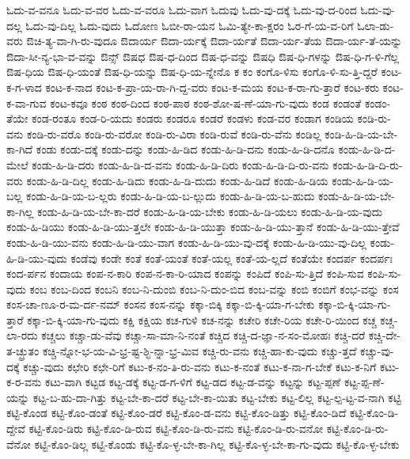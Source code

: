 {ಓದು-ವ-ವನೂ
ಓದು-ವ-ವರ
ಓದು-ವ-ವರೂ
ಓದು-ವಾಗ
ಓದುವು
ಓದು-ವು-ದಕ್ಕೆ
ಓದು-ವು-ದ-ರಿಂದ
ಓದು-ವು-ದಲ್ಲ
ಓದು-ವು-ದಿಲ್ಲ
ಓದು-ವುದು
ಓದೋಣ
ಓಬೀ-ರಾ-ಯನ
ಓಮಿ-ತ್ಯೇ-ಕಾ-ಕ್ಷರಂ
ಓರ-ಗೆ-ಯ-ವ-ರಿಗೆ
ಓಲಾ-ಡು-ವರು
ಔಚಿ-ತ್ಯ-ವಾ-ಗಿ-ರು-ವುದೂ
ಔದಾರ್ಯ
ಔದಾ-ರ್ಯಕ್ಕೆ
ಔದಾ-ರ್ಯತೆ
ಔದಾ-ರ್ಯ-ತೆಯ
ಔದಾ-ರ್ಯ-ತೆ-ಯನ್ನು
ಔದಾ-ಸೀ-ನ್ಯ-ಭಾ-ವ-ವನ್ನು
ಔನ್ಸ್
ಔಷಧ
ಔಷ-ಧ-ದಿಂದ
ಔಷ-ಧ-ವನ್ನು
ಔಷಧಿ
ಔಷ-ಧಿ-ಗಳನ್ನು
ಔಷ-ಧಿ-ಗ-ಳಿ-ಗೆಲ್ಲ
ಔಷ-ಧಿಯ
ಔಷ-ಧಿ-ಯಂತೆ
ಔಷ-ಧಿ-ಯನ್ನು
ಔಷ-ಧಿ-ಯ-ನ್ನೇನೊ
ಕ
ಕಂ
ಕಂಗೊ-ಳಿಸು
ಕಂಗೊ-ಳಿ-ಸು-ತ್ತಿ-ದ್ದರೆ
ಕಂಟ-ಕ-ಗ-ಳಾದ
ಕಂಟ-ಕ-ನಾದ
ಕಂಟ-ಕ-ಪ್ರಾ-ಯ-ರಾ-ಗಿ-ದ್ದ-ವರು
ಕಂಟ-ಕ-ಮಯ
ಕಂಟ-ಕ-ರಾ-ಗು-ತ್ತಾರೆ
ಕಂಟ-ಕರು
ಕಂಟ-ಕ-ವಾ-ಗುವ
ಕಂಟ-ಕವೂ
ಕಂಠ
ಕಂಠ-ದಿಂದ
ಕಂಠ-ಪಾಠ
ಕಂಠ-ಶೋ-ಷ-ಣೆ-ಯಾ-ಗು-ವುದು
ಕಂಡ
ಕಂಡಂತೆ
ಕಂಡಂ-ತೆಯೇ
ಕಂಡ-ರಂತೂ
ಕಂಡ-ರಿ-ಯದು
ಕಂಡರು
ಕಂಡರೂ
ಕಂಡರೆ
ಕಂಡಳು
ಕಂಡ-ವರ
ಕಂಡಾಗ
ಕಂಡಿಯ
ಕಂಡಿ-ರು-ವನು
ಕಂಡಿ-ರು-ವರೊ
ಕಂಡಿ-ರು-ವರೋ
ಕಂಡಿ-ರು-ವಿರಾ
ಕಂಡಿ-ರುವೆ
ಕಂಡಿ-ರು-ವೆನು
ಕಂಡಿಲ್ಲ
ಕಂಡಿ-ಹಿ-ಡಿ-ಯ-ಬೇ-ಕಾ-ಗಿದೆ
ಕಂಡು
ಕಂಡು-ದಕ್ಕೆ
ಕಂಡು-ದನ್ನು
ಕಂಡು-ಹಿ-ಡಿದ
ಕಂಡು-ಹಿ-ಡಿ-ದನು
ಕಂಡು-ಹಿ-ಡಿ-ದನೊ
ಕಂಡು-ಹಿ-ಡಿ-ದ-ಮೇಲೆ
ಕಂಡು-ಹಿ-ಡಿ-ದರು
ಕಂಡು-ಹಿ-ಡಿ-ದ-ವನು
ಕಂಡು-ಹಿ-ಡಿ-ದಿರು
ಕಂಡು-ಹಿ-ಡಿ-ದಿ-ರು-ವನು
ಕಂಡು-ಹಿ-ಡಿ-ದಿ-ರು-ವರು
ಕಂಡು-ಹಿ-ಡಿ-ದಿಲ್ಲ
ಕಂಡು-ಹಿ-ಡಿದು
ಕಂಡು-ಹಿ-ಡಿ-ದುದು
ಕಂಡು-ಹಿ-ಡಿದೆ
ಕಂಡು-ಹಿ-ಡಿಯ
ಕಂಡು-ಹಿ-ಡಿ-ಯ-ಬಲ್ಲ
ಕಂಡು-ಹಿ-ಡಿ-ಯ-ಬ-ಲ್ಲರು
ಕಂಡು-ಹಿ-ಡಿ-ಯ-ಬ-ಲ್ಲುದು
ಕಂಡು-ಹಿ-ಡಿ-ಯ-ಬ-ಹುದು
ಕಂಡು-ಹಿ-ಡಿ-ಯ-ಬೇ-ಕಾ-ಗಿಲ್ಲ
ಕಂಡು-ಹಿ-ಡಿ-ಯ-ಬೇ-ಕಾ-ದರೆ
ಕಂಡು-ಹಿ-ಡಿ-ಯ-ಬೇಕು
ಕಂಡು-ಹಿ-ಡಿ-ಯಲು
ಕಂಡು-ಹಿ-ಡಿ-ಯ-ವುದು
ಕಂಡು-ಹಿ-ಡಿಯು
ಕಂಡು-ಹಿ-ಡಿ-ಯು-ತ್ತಲೇ
ಕಂಡು-ಹಿ-ಡಿ-ಯುತ್ತಾ
ಕಂಡು-ಹಿ-ಡಿ-ಯು-ತ್ತಾನೆ
ಕಂಡು-ಹಿ-ಡಿ-ಯು-ತ್ತೇವೆ
ಕಂಡು-ಹಿ-ಡಿ-ಯು-ವನು
ಕಂಡು-ಹಿ-ಡಿ-ಯು-ವಾಗ
ಕಂಡು-ಹಿ-ಡಿ-ಯು-ವು-ದಕ್ಕೆ
ಕಂಡು-ಹಿ-ಡಿ-ಯು-ವು-ದಿಲ್ಲ
ಕಂಡು-ಹಿ-ಡಿ-ಯು-ವುದು
ಕಂಡೆವು
ಕಂಡೇ
ಕಂತೆ
ಕಂತೆ-ಯಂತೆ
ಕಂತೆ-ಯಲ್ಲ
ಕಂತೆ-ಯ-ಲ್ಲದೆ
ಕಂತೆಯೇ
ಕಂದರ್ಪ
ಕಂದರ್ಪಃ
ಕಂದ-ರ್ಪನ
ಕಂದಾಯ
ಕಂಪ-ನ-ಕಾರಿ
ಕಂಪ-ನ-ಕಾ-ರಿ-ಯಾದ
ಕಂಪನ್ನು
ಕಂಪಿದೆ
ಕಂಪಿ-ಸು-ತ್ತಿದೆ
ಕಂಪಿ-ಸುವ
ಕಂಪಿ-ಸು-ವುದು
ಕಂಬ
ಕಂಬ-ದಿಂದ
ಕಂಬನಿ
ಕಂಬ-ನಿ-ದುಂಬಿ
ಕಂಬ-ನಿ-ದುಂ-ಬಿದ
ಕಂಬ-ವನ್ನು
ಕಂಬಿ
ಕಂಬಿಗೆ
ಕಂಭ-ವನ್ನು
ಕಂಸ
ಕಂಸ-ಚಾ-ಣೂ-ರ-ಮ-ರ್ದ-ನಮ್
ಕಂಸನ
ಕಂಸ-ನನ್ನು
ಕಕ್ಕಾ-ಬಿಕ್ಕಿ
ಕಕ್ಕಾ-ಬಿ-ಕ್ಕಿ-ಯಾ-ಗ-ಬೇಕು
ಕಕ್ಕಾ-ಬಿ-ಕ್ಕಿ-ಯಾ-ಗು-ತ್ತಾರೆ
ಕಕ್ಕಾ-ಬಿ-ಕ್ಕಿ-ಯಾ-ಗು-ವುದು
ಕಕ್ಷಿ
ಕಕ್ಷಿಯ
ಕಚ-ಗುಳಿ
ಕಚ-ನನ್ನು
ಕಚೇರಿ
ಕಚೇ-ರಿಯ
ಕಚೇ-ರಿ-ಯಿಂದ
ಕಚ್ಚ
ಕಚ್ಚ-ಲಾ-ರದು
ಕಚ್ಚಲು
ಕಚ್ಚಾ-ಡು-ವೆವು
ಕಚ್ಚಾ-ಸಾ-ಮಾ-ನಿ-ನಂತೆ
ಕಚ್ಚಿದ
ಕಚ್ಚಿ-ದ-ಜ್ಞಾ-ನ-ಸಂ-ಮೋಹಃ
ಕಚ್ಚಿ-ದರೆ
ಕಚ್ಚಿ-ದೇ-ತ-ಚ್ಛ್ರುತಂ
ಕಚ್ಚಿ-ನ್ನೋ-ಭ-ಯ-ವಿ-ಭ್ರ-ಷ್ಟ-ಶ್ಛಿ-ನ್ನಾ-ಭ್ರ-ಮಿವ
ಕಚ್ಚಿ-ರು-ವನು
ಕಚ್ಚಿ-ಹಾ-ಕು-ವುದು
ಕಚ್ಚು-ತ್ತದೆ
ಕಚ್ಚು-ವು-ದಕ್ಕೆ
ಕಚ್ಚು-ವುದು
ಕಛೇರಿ
ಕಛೇ-ರಿಗೆ
ಕಟು-ಕ-ನಂ-ತಿ-ರು-ವನು
ಕಟು-ಕ-ನಂತೆ
ಕಟು-ಕ-ನಾ-ಗ-ಬೇಕೆ
ಕಟು-ಕ-ನಿಗೆ
ಕಟು-ಕ-ರ-ವನು
ಕಟು-ವಾಗಿ
ಕಟ್ಟಡ
ಕಟ್ಟ-ಡಕ್ಕೆ
ಕಟ್ಟ-ಡ-ಗ-ಳಿಗೆ
ಕಟ್ಟ-ಡದ
ಕಟ್ಟ-ಡ-ವನ್ನು
ಕಟ್ಟನ್ನು
ಕಟ್ಟ-ಪ್ಪಣೆ
ಕಟ್ಟ-ಪ್ಪ-ಣೆ-ಯನ್ನು
ಕಟ್ಟ-ಬ-ಹು-ದಾ-ಗಿತ್ತು
ಕಟ್ಟ-ಬೇ-ಕಾ-ದರೆ
ಕಟ್ಟ-ಬೇ-ಕಾ-ಯಿತು
ಕಟ್ಟ-ಬೇಕು
ಕಟ್ಟ-ಲಿಲ್ಲ
ಕಟ್ಟ-ಲ್ಪ-ಟ್ಟ-ವ-ನಾಗಿ
ಕಟ್ಟಿ
ಕಟ್ಟಿ-ಕೊಂಡ
ಕಟ್ಟಿ-ಕೊಂ-ಡಂತೆ
ಕಟ್ಟಿ-ಕೊಂ-ಡರೆ
ಕಟ್ಟಿ-ಕೊಂ-ಡ-ವನು
ಕಟ್ಟಿ-ಕೊಂ-ಡಿತ್ತು
ಕಟ್ಟಿ-ಕೊಂ-ಡಿದೆ
ಕಟ್ಟಿ-ಕೊಂ-ಡಿ-ದ್ದೇವೆ
ಕಟ್ಟಿ-ಕೊಂ-ಡಿರು
ಕಟ್ಟಿ-ಕೊಂ-ಡಿ-ರುವ
ಕಟ್ಟಿ-ಕೊಂ-ಡಿ-ರು-ವನು
ಕಟ್ಟಿ-ಕೊಂ-ಡಿ-ರು-ವನೋ
ಕಟ್ಟಿ-ಕೊಂ-ಡಿ-ರು-ವೆನೋ
ಕಟ್ಟಿ-ಕೊಂ-ಡಿಲ್ಲ
ಕಟ್ಟಿ-ಕೊಂಡು
ಕಟ್ಟಿ-ಕೊ-ಳ್ಳ-ಬೇ-ಕಾ-ಗಿಲ್ಲ
ಕಟ್ಟಿ-ಕೊ-ಳ್ಳ-ಬೇ-ಕಾ-ಗು-ವುದು
ಕಟ್ಟಿ-ಕೊ-ಳ್ಳ-ಬೇಕು
}
